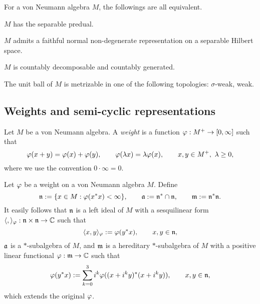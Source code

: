 \documentclass{../../../small}
\begin{document}
\begin{prop}
For a von Neumann algebra $M$, the followings are all equivalent.
\begin{parts}
\item $M$ has the separable predual.
\item $M$ admits a faithful normal non-degenerate representation on a separable Hilbert space.
\item $M$ is countably decomposable and countably generated.
\item The unit ball of $M$ is metrizable in one of the following topologies: $\sigma$-weak, weak.
\end{parts}
\end{prop}


\subsection{Weights and semi-cyclic representations}


\begin{defn}[Weights]
Let $M$ be a von Neumann algebra.
A \emph{weight} is a function $\varphi:M^+\to[0,\infty]$ such that
\[\varphi(x+y)=\varphi(x)+\varphi(y),\qquad\varphi(\lambda x)=\lambda\varphi(x),\qquad x,y\in M^+,\ \lambda\ge0,\]
where we use the convention $0\cdot\infty=0$.
\end{defn}

\begin{defn}
Let $\varphi$ be a weight on a von Neumann algebra $M$.
Define
\[\mathfrak{n}:=\{x\in M:\varphi(x^*x)<\infty\},\qquad\mathfrak{a}:=\mathfrak{n}^*\cap\mathfrak{n},\qquad\mathfrak{m}:=\mathfrak{n}^*\mathfrak{n}.\]
It easily follows that $\mathfrak{n}$ is a left ideal of $M$ with a sesquilinear form $\langle,\rangle_\varphi:\mathfrak{n}\times\mathfrak{n}\to\mathbb{C}$ such that
\[\langle x,y\rangle_\varphi:=\varphi(y^*x),\qquad x,y\in\mathfrak{n},\]
$\mathfrak{a}$ is a $*$-subalgebra of $M$, and $\mathfrak{m}$ is a hereditary $*$-subalgebra of $M$ with a positive linear functional $\varphi:\mathfrak{m}\to\mathbb{C}$ such that
\[\varphi(y^*x):=\sum_{k=0}^3i^k\varphi((x+i^ky)^*(x+i^ky)),\qquad x,y\in\mathfrak{n},\]
which extends the original $\varphi$.
\end{defn}
\end{document}
